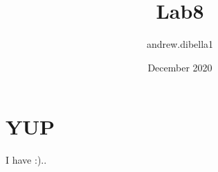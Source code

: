 \documentclass{article}
\title{Lab8}
\author{andrew.dibella1 }
\date{December 2020}
\begin{document}
\maketitle

\section{YUP}
I have :)..
\end{document}
